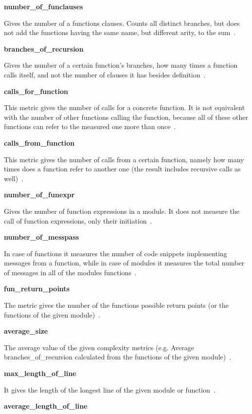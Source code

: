 \textbf{number\_of\_funclauses}

Gives the number of a functions clauses. Counts all distinct branches, but does not add the functions having the same name, but different arity, to the sum~\cite{refactorerlm}.

\textbf{branches\_of\_recursion}

Gives the number of a certain function's branches, how many times a function calls itself, and not the number of clauses it has besides definition~\cite{refactorerlm}.

\textbf{calls\_for\_function}

This metric gives the number of calls for a concrete function. It is not equivalent with the number of other functions calling the function, because all of these other functions can refer to the measured one more than once~\cite{refactorerlm}.

\textbf{calls\_from\_function}

This metric gives the number of calls from a certain function, namely how many times does a function refer to another one (the result includes recursive calls as well)~\cite{refactorerlm}.

\textbf{number\_of\_funexpr}

Gives the number of function expressions in a module. It does not measure the call of function expressions, only their initiation~\cite{refactorerlm}.

\textbf{number\_of\_messpass}

In case of functions it measures the number of code snippets implementing messages from a function, while in case of modules it measures the total number of messages in all of the modules functions~\cite{refactorerlm}.

\textbf{fun\_return\_points}

The metric gives the number of the functions possible return points (or the functions of the given module)~\cite{refactorerlm}.

\textbf{average\_size}

The average value of the given complexity metrics (e.g. Average branches\_of\_recursion calculated from the functions of the given module)~\cite{refactorerlm}.

\textbf{max\_length\_of\_line}

It gives the length of the longest line of the given module or function~\cite{refactorerlm}.

\textbf{average\_length\_of\_line}

